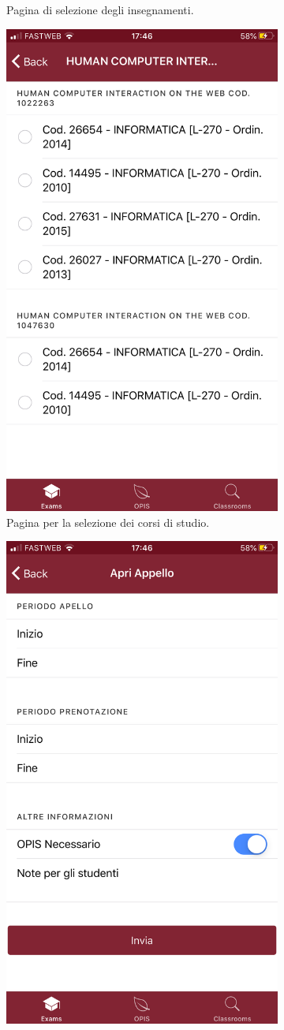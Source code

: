 \documentclass[Lau, oneside, noexaminfo]{sapthesis}%
\begin{document}
\begin{figure}[H]
\begin{subfigure}{0.6\textwidth}
	  \caption{Pagina di selezione degli insegnamenti.}
	  \label{fig:sub-second}
	\end{subfigure}
	\begin{subfigure}{0.6\textwidth}
		\centering
		\includegraphics[width=0.5\linewidth]{ui-iterations/i/select-program}  
		\caption{Pagina per la selezione dei corsi di studio.}
		\label{fig:sub-third}
	  \end{subfigure}
	  \begin{subfigure}{0.6\textwidth}
		\centering
		\includegraphics[width=0.5\linewidth]{ui-iterations/i/form}  

\end{subfigure}
\end{figure}
\end{document}
